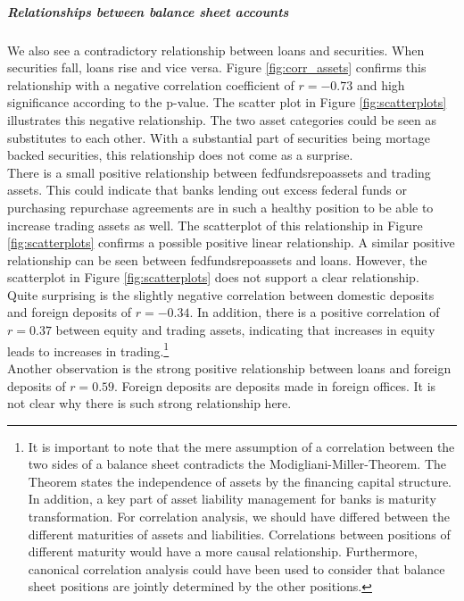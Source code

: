 \documentclass[12pt, a4paper]{article} %
\begin{document}
\subparagraph{Relationships between balance sheet accounts}
We also see a contradictory relationship between loans and securities. When securities fall, loans rise and vice versa. Figure \ref{fig:corr_assets} confirms this relationship with a negative correlation coefficient of $r=-0.73$ and high significance according to the p-value. The scatter plot in Figure \ref{fig:scatterplots} illustrates this negative relationship. The two asset categories could be seen as substitutes to each other. With a substantial part of securities being mortage backed securities, this relationship does not come as a surprise. \\
There is a small positive relationship between fedfundsrepoassets and trading assets. This could indicate that banks lending out excess federal funds or purchasing repurchase agreements are in such a healthy position to be able to increase trading assets as well. The scatterplot of this relationship in Figure \ref{fig:scatterplots} confirms a possible positive linear relationship. A similar positive relationship can be seen between fedfundsrepoassets and loans. However, the scatterplot in Figure \ref{fig:scatterplots} does not support a clear relationship.\\
Quite surprising is the slightly negative correlation between domestic deposits and foreign deposits of $r=-0.34$.
In addition, there is a positive correlation of $r=0.37$ between equity and trading assets, indicating that increases in equity leads to increases in trading.\footnote{It is important to note that the mere assumption of a correlation between the two sides of a balance sheet contradicts the Modigliani-Miller-Theorem. The Theorem states the independence of assets by the financing capital structure. In addition, a key part of asset liability management for banks is maturity transformation. For correlation analysis, we should have differed between the different maturities of assets and liabilities. Correlations between positions of different maturity would have a more causal relationship. Furthermore, canonical correlation analysis could have been used to consider that balance sheet positions are jointly determined by the other positions.}\\
Another observation is the strong positive relationship between loans and foreign deposits of $r=0.59$. Foreign deposits are deposits made in foreign offices. It is not clear why there is such strong relationship here.
\end{document}
